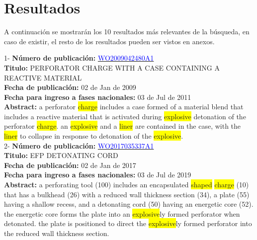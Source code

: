 \chapter{Resultados}
 A continuación se mostrarán los 10 resultados más 
    relevantes de la búsqueda, en caso de existir, el resto de los resultados pueden ser vistos en anexos.
 
 \vspace{1cm}1- \textbf{Número de publicación:} \href{https://worldwide.espacenet.com/publicationDetails/biblio?DB=EPODOC&II=0&ND=3&adjacent=true&locale=en_EP&FT=D&date=20160331&CC=WO&NR=2009042480A1&KC=A1#}{\textcolor{blue}{WO2009042480A1}}\\ 
\textbf{Titulo:} PERFORATOR CHARGE WITH A CASE CONTAINING A REACTIVE MATERIAL\\ 
 
\textbf{Fecha de publicación:} 02 de Jan de 2009\\ 
\textbf{Fecha para ingreso a fases nacionales:} 03 de Jul de 2011\\ 
\textbf{Abstract:} a perforator \colorbox{yellow}{\colorbox{yellow}{charge}} includes a case formed of a material blend that includes a reactive material that is activated during \colorbox{yellow}{\colorbox{yellow}{explosive}} detonation of the perforator \colorbox{yellow}{\colorbox{yellow}{charge}}. an \colorbox{yellow}{\colorbox{yellow}{explosive}} and a \colorbox{yellow}{liner} are contained in the case, with the \colorbox{yellow}{liner} to collapse in response to detonation of the \colorbox{yellow}{\colorbox{yellow}{explosive}}.\\ 
 

 \vspace{1cm}2- \textbf{Número de publicación:} \href{https://worldwide.espacenet.com/publicationDetails/biblio?DB=EPODOC&II=0&ND=3&adjacent=true&locale=en_EP&FT=D&date=20160331&CC=WO&NR=2017035337A1&KC=A1#}{\textcolor{blue}{WO2017035337A1}}\\ 
\textbf{Titulo:} EFP DETONATING CORD\\ 
 
\textbf{Fecha de publicación:} 02 de Jan de 2017\\ 
\textbf{Fecha para ingreso a fases nacionales:} 03 de Jul de 2019\\ 
\textbf{Abstract:} a perforating tool (100) includes an encapsulated \colorbox{yellow}{shaped} \colorbox{yellow}{\colorbox{yellow}{charge}} (10) that has a bulkhead (26) with a reduced wall thickness section (34), a plate (55) having a shallow recess, and a detonating cord (50) having an energetic core (52). the energetic core forms the plate into an \colorbox{yellow}{\colorbox{yellow}{explosive}}ly formed perforator when detonated. the plate is positioned to direct the \colorbox{yellow}{\colorbox{yellow}{explosive}}ly formed perforator into the reduced wall thickness section.\\ 
 

